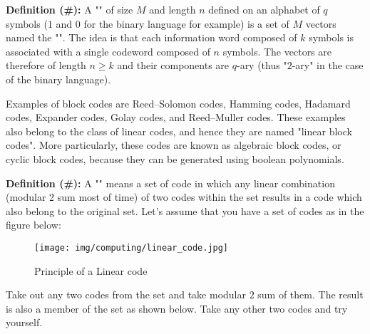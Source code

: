 	\textbf{Definition (\#\mydef):} A "" of size $M$ and length $n$ defined on an alphabet of $q$ symbols ($1$ and $0$ for the binary language for example) is a set of $M$ vectors named the "". The idea is that each information word composed of $k$ symbols is associated with a single codeword composed of $n$ symbols. The vectors are therefore of length $n\ge k$ and their components are $q$-ary (thus "$2$-ary" in the case of the binary language).
	
	Examples of block codes are Reed–Solomon codes, Hamming codes, Hadamard codes, Expander codes, Golay codes, and Reed–Muller codes. These examples also belong to the class of linear codes, and hence they are named "linear block codes". More particularly, these codes are known as algebraic block codes, or cyclic block codes, because they can be generated using boolean polynomials.
	
	\textbf{Definition (\#\mydef):} A "" means a set of code in which any linear combination (modular 2 sum most of time) of two codes within the set results in a code which also belong to the original set. Let's assume that you have a set of codes as in the figure below:
	\begin{figure}[H]
		\centering
		\texttt{[image: img/computing/linear\_code.jpg]}
		\caption{Principle of a Linear code}
	\end{figure}
	Take out any two codes from the set and take modular $2$ sum of them. The result is also a member of the set as shown below. Take any other two codes and try yourself.
	
